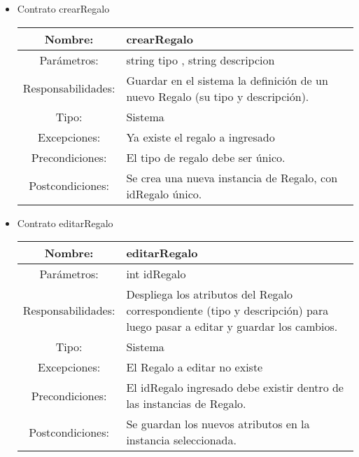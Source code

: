 

\begin{itemize}
	\item Contrato crearRegalo \\
	\begin{tabular}{|c|p{10cm}|}\hline
		Nombre: & crearRegalo\\\hline	
		Par\'ametros: & string tipo , string descripcion  \\\hline
		Responsabilidades: & Guardar en el sistema la definici\'on de un nuevo Regalo (su tipo y descripci\'on). \\\hline
		Tipo: & Sistema \\\hline
		Excepciones: & Ya existe el regalo a ingresado \\\hline
		Precondiciones: & El tipo de regalo debe ser \'unico. \\\hline
		Postcondiciones: &  Se crea una nueva instancia de Regalo, con idRegalo \'unico.\\\hline
	\end{tabular}
	\item Contrato editarRegalo \\
	\begin{tabular}{|c|p{10cm}|}\hline
		Nombre: & editarRegalo \\\hline	
		Par\'ametros: & int idRegalo \\\hline
		Responsabilidades: & Despliega los atributos del Regalo correspondiente (tipo y descripci\'on)
		para luego pasar a editar y guardar los cambios. \\\hline
		Tipo: & Sistema \\\hline
		Excepciones: & El Regalo a editar no existe \\\hline
		Precondiciones: & El idRegalo ingresado debe existir dentro de las instancias de Regalo.\\\hline
		Postcondiciones: & Se guardan los nuevos atributos en la instancia seleccionada. \\\hline
	\end{tabular}


\end{itemize}
